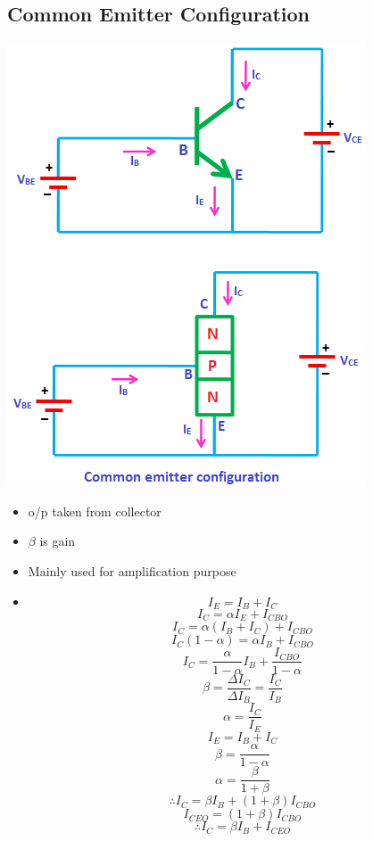 \documentclass[10pt, a4paper]{report}
\begin{document}
	\subsection{Common Emitter Configuration}
	\includegraphics[width=0.8\linewidth]{img/commonemitterconfiguration}
	\begin{itemize}
		\item o/p taken from collector
		\item $\beta$ is gain
		\item Mainly used for amplification purpose
		\item $$I_E = I_B + I_C$$ 
				$$I_C = \alpha I_E + I_{CBO}$$
				$$I_C = \alpha (I_B + I_C) + I_{CBO}$$
				$$I_C(1-\alpha) = \alpha I_B +I_{CBO}$$
				$$I_C = \dfrac{\alpha}{1-\alpha}I_B + \dfrac{I_{CBO}}{1-\alpha}$$
				$$\beta = \dfrac{\Delta I_C}{\Delta I_B} = \dfrac{I_C}{I_B} $$
				$$\alpha = \dfrac{I_C}{I_E} $$
				$$I_E = I_B + I_C$$
				$$ \beta = \dfrac{\alpha}{1-\alpha} $$
				$$\alpha = \dfrac{\beta}{1+\beta}$$
				$$\therefore I_C = \beta I_B + (1+\beta) I_{CBO}$$
				$$I_{CEO} = (1+\beta) I_{CBO}$$
				$$\therefore I_C = \beta I_B + I_{CEO} $$
	\end{itemize}
\end{document}
